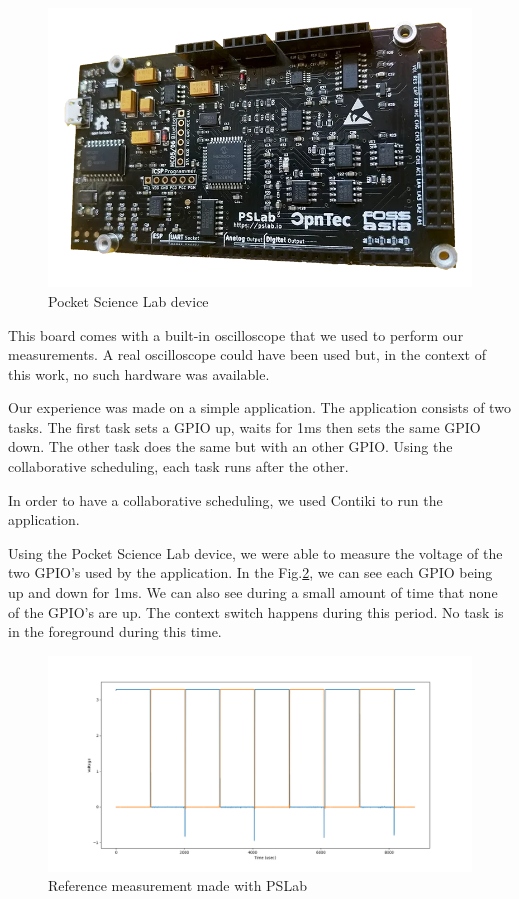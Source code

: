 \documentclass[a4paper, 10pt, conference]{ieeeconf}      %
\begin{document}
\begin{figure}[!h]
    \centering
    \includegraphics[scale=0.2]{pslab.png}
    \caption{Pocket Science Lab device}
    \label{fig:pslab}
\end{figure}

This board comes with a built-in oscilloscope that we used to perform our measurements.
A real oscilloscope could have been used but, in the context of this work, no such hardware was available.

Our experience was made on a simple application.
The application consists of two tasks.
The first task sets a GPIO up, waits for 1ms then sets the same GPIO down.
The other task does the same but with an other GPIO.
Using the collaborative scheduling, each task runs after the other.

In order to have a collaborative scheduling, we used Contiki to run the application.

Using the Pocket Science Lab device, we were able to measure the voltage of the two GPIO's used by the application.
In the Fig.\ref{fig:ref}, we can see each GPIO being up and down for 1ms.
We can also see during a small amount of time that none of the GPIO's are up.
The context switch happens during this period.
No task is in the foreground during this time.


\begin{figure}[!h]
    \centering
    \includegraphics[scale=0.2]{ref.png}
    \caption{Reference measurement made with PSLab}
    \label{fig:ref}
\end{figure}
\end{document}
